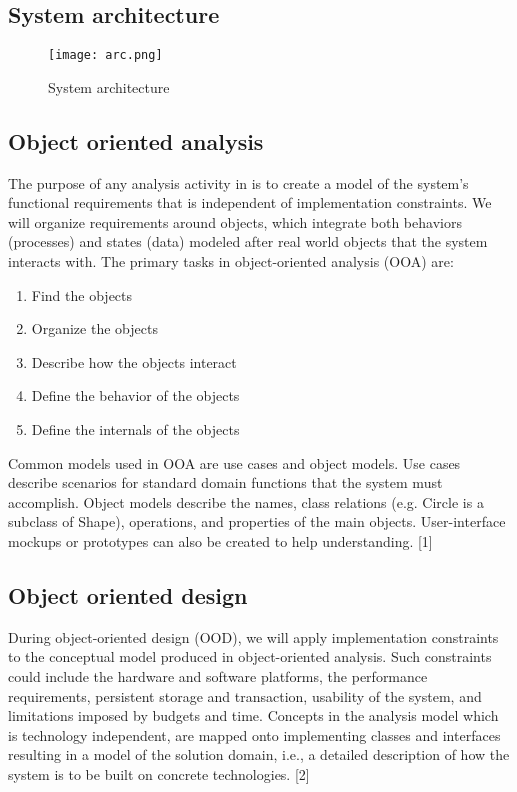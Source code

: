 \documentclass[a4paper,12pt]{article}
\begin{document}
\subsection{System architecture}
\begin{figure}[h!]
\texttt{[image: arc.png]}
\caption{System architecture}
\label{fig:architecutre}
\end{figure}


\subsection{Object oriented analysis}
The purpose of any analysis activity in is to create a model of the system's functional requirements that is independent of implementation constraints. We will organize requirements around objects, which integrate both behaviors (processes) and states (data) modeled after real world objects that the system interacts with.
The primary tasks in object-oriented analysis (OOA) are:
\begin{enumerate}[label=(\roman*)]
\item Find the objects
\item Organize the objects
\item Describe how the objects interact
\item Define the behavior of the objects
\item Define the internals of the objects
\end{enumerate}

Common models used in OOA are use cases and object models. Use cases describe scenarios for standard domain functions that the system must accomplish. Object models describe the names, class relations (e.g. Circle is a subclass of Shape), operations, and properties of the main objects. User-interface mockups or prototypes can also be created to help understanding. [1]

\subsection{Object oriented design}
During object-oriented design (OOD), we will apply implementation constraints to the conceptual model produced in object-oriented analysis. Such constraints could include the hardware and software platforms, the performance requirements, persistent storage and transaction, usability of the system, and limitations imposed by budgets and time. Concepts in the analysis model which is technology independent, are mapped onto implementing classes and interfaces resulting in a model of the solution domain, i.e., a detailed description of how the system is to be built on concrete technologies. [2]
\end{document}
